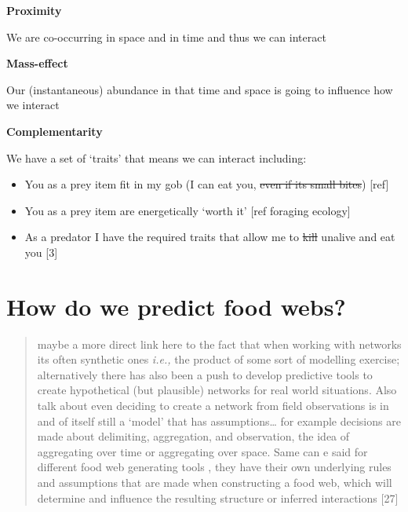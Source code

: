 \documentclass[
]{article}
\providecommand{\tightlist}{%
  \setlength{\itemsep}{0pt}\setlength{\parskip}{0pt}}\usepackage{longtable,booktabs,array}
\begin{document}
\begin{tcolorbox}[enhanced jigsaw, opacityback=0, left=2mm, toprule=.15mm, colback=white, colbacktitle=quarto-callout-note-color!10!white, titlerule=0mm, colframe=quarto-callout-note-color-frame, rightrule=.15mm, coltitle=black, opacitybacktitle=0.6, bottomtitle=1mm, toptitle=1mm, leftrule=.75mm, bottomrule=.15mm, arc=.35mm, title=\textcolor{quarto-callout-note-color}{\faInfo}\hspace{0.5em}{Box 1 - Mechanisms that determine feeding links}, breakable]

\textbf{Proximity}

We are co-occurring in space and in time and thus we can interact

\textbf{Mass-effect}

Our (instantaneous) abundance in that time and space is going to
influence how we interact

\textbf{Complementarity}

We have a set of `traits' that means we can interact including:

\begin{itemize}
\tightlist
\item
  You as a prey item fit in my gob (I can eat you, \st{even if its small
  bites}) {[}ref{]}
\item
  You as a prey item are energetically `worth it' {[}ref foraging
  ecology{]}
\item
  As a predator I have the required traits that allow me to \st{kill}
  unalive and eat you {[}3{]}
\end{itemize}

\end{tcolorbox}

\section{How do we predict food webs?}\label{sec-network-build}

\begin{quote}
maybe a more direct link here to the fact that when working with
networks its often synthetic ones \emph{i.e.,} the product of some sort
of modelling exercise; alternatively there has also been a push to
develop predictive tools to create hypothetical (but plausible) networks
for real world situations. Also talk about even deciding to create a
network from field observations is in and of itself still a `model' that
has assumptions\ldots{} for example decisions are made about delimiting,
aggregation, and observation, the idea of aggregating over time or
aggregating over space. Same can e said for different food web
generating tools , they have their own underlying rules and assumptions
that are made when constructing a food web, which will determine and
influence the resulting structure or inferred interactions {[}27{]}
\end{quote}
\end{document}
